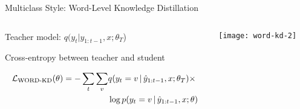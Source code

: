 

\begin{frame}{Multiclass Style: Word-Level Knowledge Distillation}

\begin{columns}
\begin{column}{7cm}
Teacher model: $q(y_{t} | y_{1:t-1}, x; \theta_T$)
\air

Cross-entropy between teacher and student

\begin{align*}
\mathcal{L}_{\text{WORD-KD}}(\theta) = -\sum_t \sum_v &q(y_t=v \,|\, \hat{y}_{1: t-1}, x ; \theta_T)\times \\
& \log p(y_t =v \,|\, \hat{y}_{1: t-1}, x ; \theta)
\end{align*}
\end{column}

\begin{column}{7cm}
\centering

\texttt{[image: word-kd-2]}
\end{column}
\end{columns}
\end{frame}


